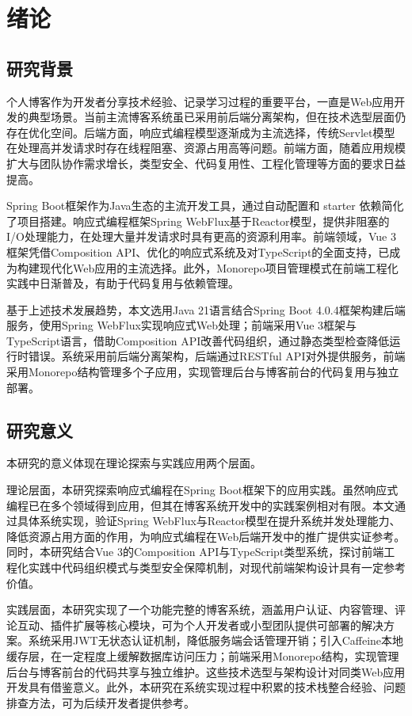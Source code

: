 \documentclass[UTF8,AutoFakeBold=1,AutoFakeSlant,zihao=-4]{SCAU}
\begin{document}

\section{绪论}

\subsection{研究背景}

个人博客作为开发者分享技术经验、记录学习过程的重要平台，一直是Web应用开发的典型场景。当前主流博客系统虽已采用前后端分离架构，但在技术选型层面仍存在优化空间。后端方面，响应式编程模型逐渐成为主流选择，传统Servlet模型在处理高并发请求时存在线程阻塞、资源占用高等问题。前端方面，随着应用规模扩大与团队协作需求增长，类型安全、代码复用性、工程化管理等方面的要求日益提高。

Spring Boot框架作为Java生态的主流开发工具，通过自动配置和 starter 依赖简化了项目搭建。响应式编程框架Spring WebFlux基于Reactor模型，提供非阻塞的I/O处理能力，在处理大量并发请求时具有更高的资源利用率。前端领域，Vue 3框架凭借Composition API、优化的响应式系统及对TypeScript的全面支持，已成为构建现代化Web应用的主流选择。此外，Monorepo项目管理模式在前端工程化实践中日渐普及，有助于代码复用与依赖管理。

基于上述技术发展趋势，本文选用Java 21语言结合Spring Boot 4.0.4框架构建后端服务，使用Spring WebFlux实现响应式Web处理；前端采用Vue 3框架与TypeScript语言，借助Composition API改善代码组织，通过静态类型检查降低运行时错误。系统采用前后端分离架构，后端通过RESTful API对外提供服务，前端采用Monorepo结构管理多个子应用，实现管理后台与博客前台的代码复用与独立部署。

\subsection{研究意义}

本研究的意义体现在理论探索与实践应用两个层面。

理论层面，本研究探索响应式编程在Spring Boot框架下的应用实践。虽然响应式编程已在多个领域得到应用，但其在博客系统开发中的实践案例相对有限。本文通过具体系统实现，验证Spring WebFlux与Reactor模型在提升系统并发处理能力、降低资源占用方面的作用，为响应式编程在Web后端开发中的推广提供实证参考。同时，本研究结合Vue 3的Composition API与TypeScript类型系统，探讨前端工程化实践中代码组织模式与类型安全保障机制，对现代前端架构设计具有一定参考价值。

实践层面，本研究实现了一个功能完整的博客系统，涵盖用户认证、内容管理、评论互动、插件扩展等核心模块，可为个人开发者或小型团队提供可部署的解决方案。系统采用JWT无状态认证机制，降低服务端会话管理开销；引入Caffeine本地缓存层，在一定程度上缓解数据库访问压力；前端采用Monorepo结构，实现管理后台与博客前台的代码共享与独立维护。这些技术选型与架构设计对同类Web应用开发具有借鉴意义。此外，本研究在系统实现过程中积累的技术栈整合经验、问题排查方法，可为后续开发者提供参考。
\end{document}
